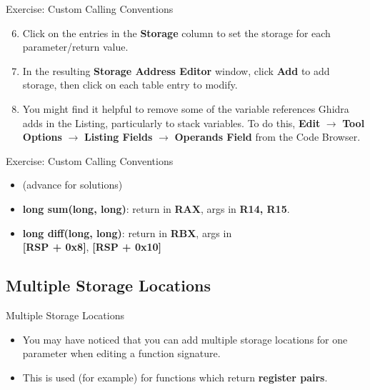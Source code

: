 \documentclass{beamer}
\begin{document}
\begin{frame}
\begin{block}{Exercise: Custom Calling Conventions}
\begin{enumerate}
\setcounter{enumi}{5}
\item Click on the entries in the \textbf{Storage} column to set the storage for each parameter/return value.
\item In the resulting \textbf{Storage Address Editor} window, click \textbf{Add} to add storage, then click on each
table entry to modify.
\item You might find it helpful to remove some of the variable references Ghidra adds in the Listing, particularly to stack variables.  To do this, \textbf{Edit}
$\rightarrow$ \textbf{Tool Options} $\rightarrow$ \textbf{Listing Fields} $\rightarrow$ \textbf{Operands Field} from the Code Browser.
\end{enumerate}
\end{block}
\end{frame}

\begin{frame}
\begin{block}{Exercise: Custom Calling Conventions}
\begin{itemize}
\item[] (advance for solutions)
\pause
\item \textbf{long sum(long, long)}: return in \textbf{RAX}, args in \textbf{R14, R15}.
\item \textbf{long diff(long, long)}: return in \textbf{RBX}, args in \\ \textbf{[RSP + 0x8]}, \textbf{[RSP + 0x10]}
\end{itemize}
\end{block}
\end{frame}

\subsection{Multiple Storage Locations}
\begin{frame}
\begin{block}{Multiple Storage Locations}
\begin{itemize}
\item You may have noticed that you can add multiple storage locations for one parameter when editing a function signature.
\item This is used (for example) for functions which return \textbf{register pairs}.
\end{itemize}
\end{block}
\end{frame}
\end{document}
